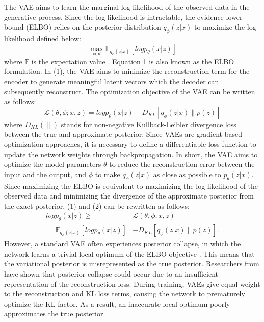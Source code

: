 The VAE aims to learn the marginal log-likelihood of the observed data in the generative process. Since the log-likelihood is intractable, the evidence lower bound (ELBO) relies on the posterior distribution $q_\phi(z|x)$ to maximize the log-likelihood defined below:
\begin{equation}
\max_{\phi, \theta} \mathbb{E}_{q_\phi(z|x)}[log p_\theta(x|z)]\label{eq}
\end{equation}
where $\mathbb{E}$ is the expectation value \cite{richards2022conditional}. Equation 1 is also known as the ELBO formulation. In (1), the VAE aims to minimize the reconstruction term for the encoder to generate meaningful latent vectors which the decoder can subsequently reconstruct. The optimization objective of the VAE can be written as follows:
\begin{equation}
\mathcal{L}(\theta,\phi;x,z) = log p_\theta(x|z) - D_{KL}[q_\phi(z|x)\parallel p(z)]\label{eq}
\end{equation}
where $D_{KL}(\parallel)$ stands for non-negative Kullback-Leibler divergence loss between the true and approximate posterior. Since VAEs are gradient-based optimization approaches, it is necessary to define a differentiable loss function to update the network weights through backpropagation. In short, the VAE aims to optimize the model parameters $\theta$ to reduce the reconstruction error between the input and the output, and $\phi$ to make $q_\phi(z|x)$ as close as possible to $p_\theta(z|x)$. Since maximizing the ELBO is equivalent to maximizing the log-likelihood of the observed data and minimizing the divergence of the approximate posterior from the exact posterior, (1) and (2) can be rewritten as follows:
\begin{equation}
\begin{split}
log p_\theta(x|z) \geq & \mathcal{L}(\theta,\phi;x,z) \\= \mathbb{E}_{q_\phi(z|x)}[log p_\theta(x|z)]
& - D_{KL}[q_\phi(z|x)\parallel p(z)]. \label{eq}
\end{split}
\end{equation}
However, a standard VAE often experiences posterior collapse, in which the network learns a trivial local optimum of the ELBO objective \cite{richards2022conditional}. This means that the variational posterior is misrepresented as the true posterior. Researchers from \cite{higgins2016beta} have shown that posterior collapse could occur due to an insufficient representation of the reconstruction loss. During training, VAEs give equal weight to the reconstruction and KL loss terms, causing the network to prematurely optimize the KL factor. As a result, an inaccurate local optimum poorly approximates the true posterior.

